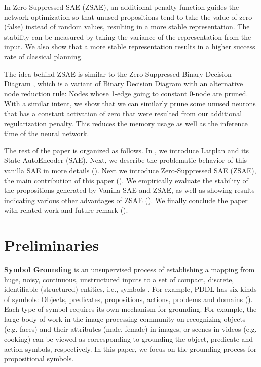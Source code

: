 In Zero-Suppressed SAE (ZSAE), an additional penalty function
guides the network optimization so that unused propositions tend to 
take the value of zero (false) instead of random values,
resulting in a more stable representation.
The stability can be measured by taking the variance of the representation from the input.
We also show that a more stable representation results in a higher success rate of classical planning.

The idea behind ZSAE is similar to the Zero-Suppressed Binary Decision Diagram \cite{minato1993zero},
which is a variant of Binary Decision Diagram \cite{bryant1986graph} with an alternative node reduction rule:
Nodes whose 1-edge going to constant 0-node are pruned.
With a similar intent, we show that we can similarly prune some unused neurons
that has a constant activation of zero
that were resulted from our additional regularization penalty.
This reduces the memory usage as well as the inference time of the neural network.

The rest of the paper is organized as follows.
In , we introduce Latplan \cite{Asai2018} and its State AutoEncoder (SAE).
Next, we describe the problematic behavior of this vanilla SAE in more details ().
Next we introduce Zero-Suppressed SAE (ZSAE), the main contribution of this paper ().
We empirically evaluate the stability of the propositions generated by Vanilla SAE and ZSAE,
as well as showing results indicating various other advantages of ZSAE ().
We finally conclude the paper with related work and future remark ().


\section{Preliminaries}
\label{background}

\textbf{Symbol Grounding} is an unsupervised process of establishing a mapping
from huge, noisy, continuous, unstructured inputs
to a set of compact, %
discrete, identifiable (structured) entities, i.e., symbols \cite{Asai2018}.
For example, PDDL has six kinds of symbols: Objects, predicates, propositions, actions, problems and domains ().
Each type of symbol requires its own mechanism for grounding.
For example, the large body of work in the image processing community on recognizing 
objects (e.g. faces) and their attributes (male, female) in images, or scenes in videos (e.g. cooking)
can be viewed as corresponding to grounding the object, predicate and action symbols, respectively.
In this paper, we focus on the grounding process for propositional symbols.


